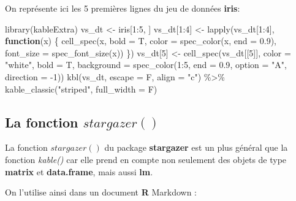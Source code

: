 \documentclass[
]{book}
\newenvironment{Shaded}{\begin{snugshade}}{\end{snugshade}}
\newcommand{\AttributeTok}[1]{\textcolor[rgb]{0.77,0.63,0.00}{#1}}
\newcommand{\ControlFlowTok}[1]{\textcolor[rgb]{0.13,0.29,0.53}{\textbf{#1}}}
\newcommand{\DecValTok}[1]{\textcolor[rgb]{0.00,0.00,0.81}{#1}}
\newcommand{\FloatTok}[1]{\textcolor[rgb]{0.00,0.00,0.81}{#1}}
\newcommand{\FunctionTok}[1]{\textcolor[rgb]{0.00,0.00,0.00}{#1}}
\newcommand{\NormalTok}[1]{#1}
\newcommand{\OtherTok}[1]{\textcolor[rgb]{0.56,0.35,0.01}{#1}}
\newcommand{\SpecialCharTok}[1]{\textcolor[rgb]{0.00,0.00,0.00}{#1}}
\newcommand{\StringTok}[1]{\textcolor[rgb]{0.31,0.60,0.02}{#1}}
\theoremstyle{definition}
\theoremstyle{definition}
\theoremstyle{definition}
\theoremstyle{definition}
\theoremstyle{remark}
\begin{document}
On représente ici les 5 premières lignes du jeu de données \textbf{iris}:

\begin{Shaded}
\begin{Highlighting}[]
\FunctionTok{library}\NormalTok{(kableExtra)}
\NormalTok{vs\_dt }\OtherTok{\textless{}{-}}\NormalTok{ iris[}\DecValTok{1}\SpecialCharTok{:}\DecValTok{5}\NormalTok{, ]}
\NormalTok{vs\_dt[}\DecValTok{1}\SpecialCharTok{:}\DecValTok{4}\NormalTok{] }\OtherTok{\textless{}{-}} \FunctionTok{lapply}\NormalTok{(vs\_dt[}\DecValTok{1}\SpecialCharTok{:}\DecValTok{4}\NormalTok{], }\ControlFlowTok{function}\NormalTok{(x) \{}
    \FunctionTok{cell\_spec}\NormalTok{(x, }\AttributeTok{bold =}\NormalTok{ T, }\AttributeTok{color =} \FunctionTok{spec\_color}\NormalTok{(x, }\AttributeTok{end =} \FloatTok{0.9}\NormalTok{),}
              \AttributeTok{font\_size =} \FunctionTok{spec\_font\_size}\NormalTok{(x))}
\NormalTok{\})}
\NormalTok{vs\_dt[}\DecValTok{5}\NormalTok{] }\OtherTok{\textless{}{-}} \FunctionTok{cell\_spec}\NormalTok{(vs\_dt[[}\DecValTok{5}\NormalTok{]], }\AttributeTok{color =} \StringTok{"white"}\NormalTok{, }\AttributeTok{bold =}\NormalTok{ T,}
    \AttributeTok{background =} \FunctionTok{spec\_color}\NormalTok{(}\DecValTok{1}\SpecialCharTok{:}\DecValTok{5}\NormalTok{, }\AttributeTok{end =} \FloatTok{0.9}\NormalTok{, }\AttributeTok{option =} \StringTok{"A"}\NormalTok{, }\AttributeTok{direction =} \SpecialCharTok{{-}}\DecValTok{1}\NormalTok{))}
\FunctionTok{kbl}\NormalTok{(vs\_dt, }\AttributeTok{escape =}\NormalTok{ F, }\AttributeTok{align =} \StringTok{"c"}\NormalTok{) }\SpecialCharTok{\%\textgreater{}\%} \FunctionTok{kable\_classic}\NormalTok{(}\StringTok{"striped"}\NormalTok{, }\AttributeTok{full\_width =}\NormalTok{ F)}
\end{Highlighting}
\end{Shaded}

\hypertarget{la-fonction-stargazer}{%
\subsection{\texorpdfstring{La fonction \(stargazer()\)}{La fonction stargazer()}}\label{la-fonction-stargazer}}

La fonction \(stargazer()\) du package \textbf{stargazer} est un plus général que la fonction \emph{kable()} car elle prend en compte non seulement des objets de type \textbf{matrix} et \textbf{data.frame}, mais aussi \textbf{lm}.

On l'utilise ainsi dans un document \textbf{R} Markdown :
\end{document}
